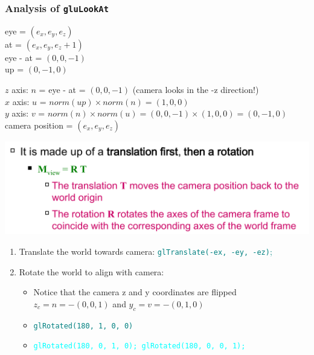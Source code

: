 \documentclass{beamer}
\begin{document}
\begin{frame}
    \frametitle{Analysis of \texttt{gluLookAt}}

    eye = $(e_x, e_y, e_z)$\\
    at = $(e_x, e_y, e_z+1)$\\
    eye - at = $(0, 0, -1)$\\
    up = $(0, -1, 0)$\\

    \vspace{1em}

    \begin{tcolorbox}
        $z$ axis: $n$ = eye - at = $(0, 0, -1)$ (camera looks in the -z direction!)\\
        $x$ axis: $u$ = $norm(up) \times norm(n) = (1, 0, 0)$\\
        $y$ axis: $v$ = $norm(n) \times norm(u) = (0, 0, -1) \times (1, 0, 0) = (0, -1, 0)$\\
        camera position = $(e_x, e_y, e_z)$\\
    \end{tcolorbox}

\end{frame}

\begin{frame}

    \begin{center}
        \includegraphics[scale=0.3]{mview.png}
    \end{center}

    \begin{enumerate}
        \item Translate the world towards camera: \textcolor{teal}{\texttt{glTranslate(-ex, -ey, -ez)};}
        \item Rotate the world to align with camera: 
        \begin{itemize}
            \item Notice that the camera z and y coordinates are flipped $z_c = n = -(0,0,1)$ and $y_c = v = -(0,1,0)$
            \item \textcolor{teal}{\texttt{glRotated(180, 1, 0, 0)}}
            \item \textcolor{cyan}{\texttt{glRotated(180, 0, 1, 0); glRotated(180, 0, 0, 1);}}
        \end{itemize}
    \end{enumerate}

\end{frame}
\end{document}
